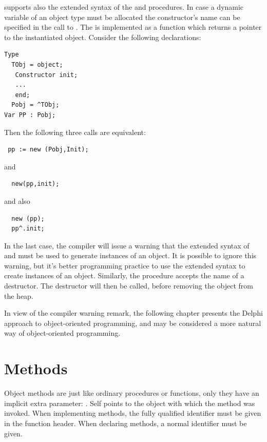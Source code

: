 \fpc supports also the extended syntax of the  and 
procedures. In case a dynamic variable of an object type must be allocated
the constructor's name can be specified in the call to .
The  is implemented as a function which returns a pointer to the
instantiated object. Consider the following declarations:
\begin{verbatim}
Type
  TObj = object;
   Constructor init;
   ...
   end;
  Pobj = ^TObj;
Var PP : Pobj;
\end{verbatim}
Then the following three calls are equivalent:
\begin{verbatim}
 pp := new (Pobj,Init);
\end{verbatim}
and
\begin{verbatim}
  new(pp,init);
\end{verbatim}
and also
\begin{verbatim}
  new (pp);
  pp^.init;
\end{verbatim}
In the last case, the compiler will issue a warning that the
extended syntax of  and  must be used to generate instances of an
object. It is possible to ignore this warning, but it's better programming practice to
use the extended syntax to create instances of an object.
Similarly, the  procedure accepts the name of a destructor. The
destructor will then be called, before removing the object from the heap.

In view of the compiler warning remark, the following chapter presents the
Delphi approach to object-oriented programming, and may be considered a
more natural way of object-oriented programming.

\section{Methods}
Object methods are just like ordinary procedures or functions, only they
have an implicit extra parameter: . Self points to the object
with which the method was invoked.
When implementing methods, the fully qualified identifier must be given
in the function header. When declaring methods, a normal identifier must be
given.

